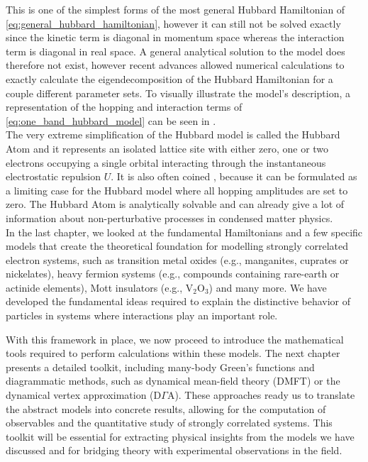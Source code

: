 \documentclass[../../main.tex]{subfiles}
\begin{document}
This is one of the simplest forms of the most general Hubbard Hamiltonian of \eqref{eq:general_hubbard_hamiltonian}, however it can still not be solved exactly since the kinetic term is diagonal in momentum space whereas the interaction term is diagonal in real space. A general analytical solution to the model does therefore not exist, however recent advances allowed numerical calculations to exactly calculate the eigendecomposition of the Hubbard Hamiltonian for a couple different parameter sets. To visually illustrate the model's description, a representation of the hopping and interaction terms of \eqref{eq:one_band_hubbard_model} can be seen in .
\\
The very extreme simplification of the Hubbard model is called the Hubbard Atom and it represents an isolated lattice site with either zero, one or two electrons occupying a single orbital interacting through the instantaneous electrostatic repulsion $U$. It is also often coined , because it can be formulated as a limiting case for the Hubbard model where all hopping amplitudes are set to zero. The Hubbard Atom is analytically solvable and can already give a lot of information about non-perturbative processes in condensed matter physics.
\\

In the last chapter, we looked at the fundamental Hamiltonians and a few specific models that create the theoretical foundation for modelling strongly correlated electron systems, such as transition metal oxides (e.g., manganites, cuprates or nickelates), heavy fermion systems (e.g., compounds containing rare-earth or actinide elements), Mott insulators (e.g., $\text{V}_2\text{O}_3$) and many more. We have developed the fundamental ideas required to explain the distinctive behavior of particles in systems where interactions play an important role.

With this framework in place, we now proceed to introduce the mathematical tools required to perform calculations within these models. The next chapter presents a detailed toolkit, including many-body Green's functions and diagrammatic methods, such as dynamical mean-field theory (DMFT) or the dynamical vertex approximation ($\text{D}\Gamma\text{A}$). These approaches ready us to translate the abstract models into concrete results, allowing for the computation of observables and the quantitative study of strongly correlated systems. This toolkit will be essential for extracting physical insights from the models we have discussed and for bridging theory with experimental observations in the field.
\end{document}
